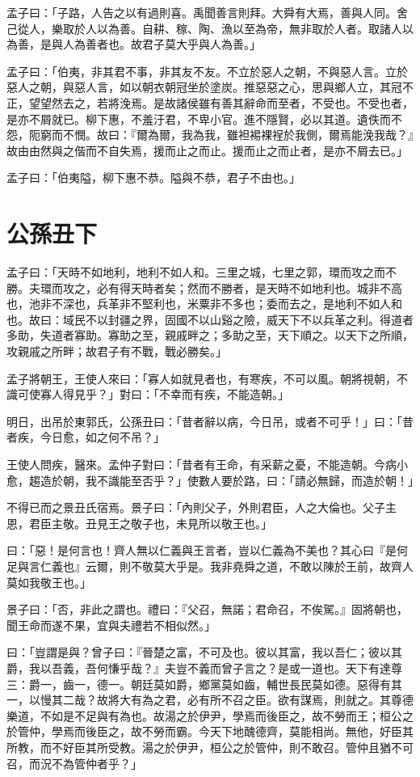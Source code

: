 \documentclass[12pt,a4paper]{ctexbook}
\begin{document}
孟子曰：「子路，人告之以有過則喜。禹聞善言則拜。大舜有大焉，善與人同。舍己從人，樂取於人以為善。自耕、稼、陶、漁以至為帝，無非取於人者。取諸人以為善，是與人為善者也。故君子莫大乎與人為善。」\par
孟子曰：「伯夷，非其君不事，非其友不友。不立於惡人之朝，不與惡人言。立於惡人之朝，與惡人言，如以朝衣朝冠坐於塗炭。推惡惡之心，思與鄉人立，其冠不正，望望然去之，若將浼焉。是故諸侯雖有善其辭命而至者，不受也。不受也者，是亦不屑就已。柳下惠，不羞汙君，不卑小官。進不隱賢，必以其道。遺佚而不怨，阨窮而不憫。故曰：『爾為爾，我為我，雖袒裼裸裎於我側，爾焉能浼我哉？』故由由然與之偕而不自失焉，援而止之而止。援而止之而止者，是亦不屑去已。」\par
孟子曰：「伯夷隘，柳下惠不恭。隘與不恭，君子不由也。」\par

\section{公孫丑下}
孟子曰：「天時不如地利，地利不如人和。三里之城，七里之郭，環而攻之而不勝。夫環而攻之，必有得天時者矣；然而不勝者，是天時不如地利也。城非不高也，池非不深也，兵革非不堅利也，米粟非不多也；委而去之，是地利不如人和也。故曰：域民不以封疆之界，固國不以山谿之險，威天下不以兵革之利。得道者多助，失道者寡助。寡助之至，親戚畔之；多助之至，天下順之。以天下之所順，攻親戚之所畔；故君子有不戰，戰必勝矣。」\par
孟子將朝王，王使人來曰：「寡人如就見者也，有寒疾，不可以風。朝將視朝，不識可使寡人得見乎？」對曰：「不幸而有疾，不能造朝。」\par
明日，出吊於東郭氏，公孫丑曰：「昔者辭以病，今日吊，或者不可乎！」曰：「昔者疾，今日愈，如之何不吊？」\par
王使人問疾，醫來。孟仲子對曰：「昔者有王命，有采薪之憂，不能造朝。今病小愈，趨造於朝，我不識能至否乎？」使數人要於路，曰：「請必無歸，而造於朝！」\par
不得已而之景丑氏宿焉。景子曰：「內則父子，外則君臣，人之大倫也。父子主恩，君臣主敬。丑見王之敬子也，未見所以敬王也。」\par
曰：「惡！是何言也！齊人無以仁義與王言者，豈以仁義為不美也？其心曰『是何足與言仁義也』云爾，則不敬莫大乎是。我非堯舜之道，不敢以陳於王前，故齊人莫如我敬王也。」\par
景子曰：「否，非此之謂也。禮曰：『父召，無諾；君命召，不俟駕。』固將朝也，聞王命而遂不果，宜與夫禮若不相似然。」\par
曰：「豈謂是與？曾子曰：『晉楚之富，不可及也。彼以其富，我以吾仁；彼以其爵，我以吾義，吾何慊乎哉？』夫豈不義而曾子言之？是或一道也。天下有達尊三：爵一，齒一，德一。朝廷莫如爵，鄉黨莫如齒，輔世長民莫如德。惡得有其一，以慢其二哉？故將大有為之君，必有所不召之臣。欲有謀焉，則就之。其尊德樂道，不如是不足與有為也。故湯之於伊尹，學焉而後臣之，故不勞而王；桓公之於管仲，學焉而後臣之，故不勞而霸。今天下地醜德齊，莫能相尚。無他，好臣其所教，而不好臣其所受教。湯之於伊尹，桓公之於管仲，則不敢召。管仲且猶不可召，而況不為管仲者乎？」\par
\end{document}
